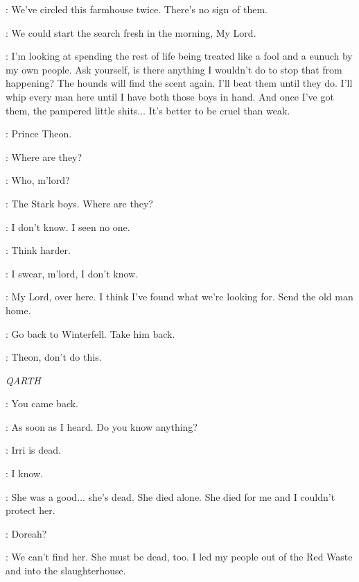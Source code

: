 \DAGMER: We've circled this farmhouse twice. There's no sign of them. 

\LUWIN: We could start the search fresh in the morning, My Lord.

\THEON: I'm looking at spending the rest of life being treated like a fool and a eunuch by my own people. Ask yourself, is there anything I wouldn't do to stop that from happening? The hounds will find the scent again. I'll beat them until they do. I'll whip every man here until I have both those boys in hand. And once I've got them, the pampered little shits$\ldots$ It's better to be cruel than weak.


\DAGMER: Prince Theon.

\THEON: Where are they?

\FARMER: Who, m'lord?

\THEON: The Stark boys. Where are they?

\FARMER: I don't know. I seen no one.


\THEON: Think harder.

\FARMER: I swear, m'lord, I don't know.

\DAGMER: My Lord, over here. I think I've found what we're looking for. Send the old man home.


\THEON:  Go back to Winterfell.  Take him back.

\LUWIN: Theon, don't do this.


\scene

\textit{QARTH}


\DAENERYS: You came back.

\JORAH: As soon as I heard. Do you know anything?


\DAENERYS: Irri is dead.

\JORAH: I know.

\DAENERYS: She was a good$\ldots$ she's dead. She died alone. She died for me and I couldn't protect her.

\JORAH: Doreah?

\DAENERYS: We can't find her. She must be dead, too. I led my people out of the Red Waste and into the slaughterhouse.

